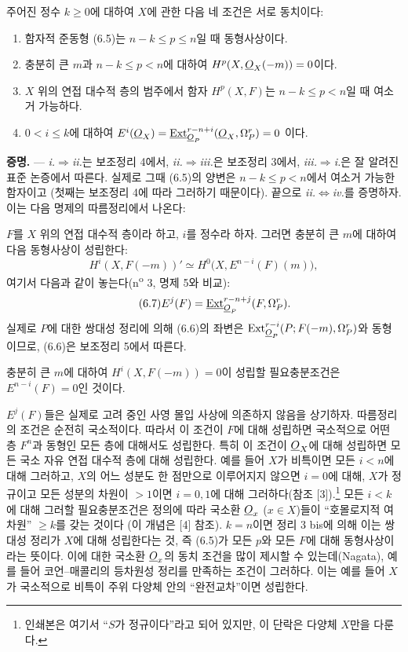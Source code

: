 주어진 정수 $k\geq0$에 대하여 $X$에 관한
다음 네 조건은 서로 동치이다:
\begin{enumerate}
  \item[\textit{i.}] 함자적 준동형 (6.5)는 $n-k\leq p\leq n$일 때
    동형사상이다.
  \item[\textit{ii.}] 충분히 큰 $m$과 $n-k\leq p<n$에 대하여
    $H^{p}(X,\underline{O}_X(-m))=0$이다.
  \item[\textit{iii.}] $X$ 위의 연접 대수적 층의 범주에서 함자
    $H^{p}(X,F)$는 $n-k\leq p<n$일 때 여소거 가능하다.
  \item[\textit{iv.}] $0<i\leq k$에 대하여
    $E^{i}(\underline{O}_X)=\underline{\operatorname{Ext}}_{\underline{O}_P}^{r-n+i}(\underline{O}_X,\Omega_P^{r})=0$
    이다.
\end{enumerate}

\noindent\textbf{증명.} --- \textit{i.}$\Rightarrow$\textit{ii.}는
보조정리 4에서, \textit{ii.}$\Rightarrow$\textit{iii.}은 보조정리 3에서,
\textit{iii.}$\Rightarrow$\textit{i.}은 잘 알려진 표준 논증에서 따른다.
실제로 그때 (6.5)의 양변은 $n-k\leq p<n$에서 여소거 가능한 함자이고
(첫째는 보조정리 4에 따라 그러하기 때문이다). 끝으로
\textit{ii.}$\Leftrightarrow$\textit{iv.}를 증명하자. 이는 다음 명제의
따름정리에서 나온다:

 $F$를 $X$ 위의 연접 대수적 층이라 하고,
$i$를 정수라 하자. 그러면 충분히 큰 $m$에 대하여 다음 동형사상이 성립한다:
\begin{equation}\tag{6.6}
  H^{i}(X,F(-m))'
  \simeq H^{0}\bigl(X,E^{n-i}(F)(m)\bigr),
\end{equation}
여기서 다음과 같이 놓는다(n\textsuperscript{o} 3, 명제 5와 비교):
\begin{equation}\tag{6.7}
  E^{j}(F)=\underline{\operatorname{Ext}}_{\underline{O}_P}^{r-n+j}(F,\Omega_P^{r}).
\end{equation}
실제로 $P$에 대한 쌍대성 정리에 의해 (6.6)의 좌변은
$\operatorname{Ext}_{\underline{O}_P}^{r-i}(P;F(-m),\Omega_P^{r})$와 동형이므로,
(6.6)은 보조정리 5에서
따른다.

 충분히 큰 $m$에 대하여 $H^{i}(X,F(-m))=0$이
성립할 필요충분조건은 $E^{n-i}(F)=0$인 것이다.

$E^{j}(F)$들은 실제로 고려 중인 사영 몰입 사상에 의존하지 않음을 상기하자.
따름정리의 조건은 순전히 국소적이다. 따라서
이 조건이 $F$에 대해 성립하면 국소적으로
어떤 층 $F^{n}$과 동형인 모든 층에 대해서도 성립한다. 특히 이 조건이
$\underline{O}_X$에 대해 성립하면 모든 국소 자유 연접 대수적 층에 대해
성립한다. 예를 들어 $X$가 비특이면 모든 $i<n$에 대해 그러하고,
$X$의 어느 성분도 한 점만으로 이루어지지 않으면 $i=0$에 대해,
$X$가 정규이고 모든 성분의 차원이 $>1$이면 $i=0,1$에 대해 그러하다(참조
[3]).\footnote{인쇄본은 여기서 ``$S$가 정규이다''라고 되어 있지만, 이 단락은
다양체 $X$만을 다룬다.} 모든 $i<k$에 대해 그러할 필요충분조건은
정의에 따라 국소환
$\underline{O}_x$ ($x\in X$)들이 ``호몰로지적 여차원'' $\geq k$를 갖는 것이다
(이 개념은 [4] 참조). $k=n$이면 정리 3 bis에 의해 이는
쌍대성 정리가 $X$에 대해 성립한다는 것, 즉 (6.5)가
모든 $p$와 모든 $F$에 대해 동형사상이라는 뜻이다. 이에 대한 국소환
$\underline{O}_x$의 동치 조건을 많이 제시할 수 있는데(Nagata), 예를 들어
코언--매콜리의 등차원성 정리를 만족하는 조건이 그러하다. 이는
예를 들어 $X$가 국소적으로 비특이 주위 다양체 안의 ``완전교차''이면
성립한다.

